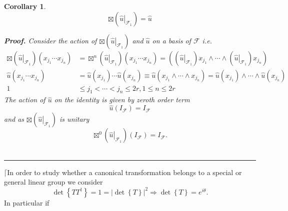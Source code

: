 \documentclass[aps, preprint]{revtex4}
\newtheorem{corollary}[theorem]{Corollary}
\newenvironment{proof}[1][Proof]{\noindent\textbf{#1.} }{\ \rule{0.5em}{0.5em}}
\begin{document}
\begin{corollary}
\begin{equation} \boxtimes \left (\left .\widehat{u}\right \vert _{\mathcal{F}_{1}}\right ) =\widehat{u}
\end{equation}


\begin{proof}
Consider the action of $ \boxtimes \left (\left .\widehat{u}\right \vert _{\mathcal{F}_{1}}\right )$ and $\widehat{u}$ on a basis of $\mathcal{F}$ i.e.
\begin{align} \boxtimes \left (\left .\widehat{u}\right \vert _{\mathcal{F}_{1}}\right ) \left (x_{j_{1}} \cdots  x_{j_{n}}\right ) &  = \boxtimes ^{n}\left (\left .\widehat{u}\right \vert _{\mathcal{F}_{1}}\right ) \left (x_{j_{1}} \cdots  x_{j_{n}}\right ) =\left (\left (\left .\widehat{u}\right \vert _{\mathcal{F}_{1}}\right ) x_{j_{1}} \wedge \cdots  \wedge \left (\left .\widehat{u}\right \vert _{\mathcal{F}_{1}}\right ) x_{j_{n}}\right ) \\
\widehat{u} \left (x_{j_{1}} \cdots  x_{j_{n}}\right ) &  =\widehat{u} \left (x_{j_{1}}\right ) \cdots  \widehat{u} \left (x_{j_{n}}\right ) \equiv \widehat{u} \left (x_{j_{1}} \wedge \cdots  \wedge x_{j_{n}}\right ) =\widehat{u} \left (x_{j_{1}}\right ) \wedge \cdots  \wedge \widehat{u} \left (x_{j_{n}}\right ) \\
1 &  \leq j_{1} <\cdots  <j_{n} \leq 2 r ,1 \leq n \leq 2 r\end{align}The action of $\widehat{u}$ on the identity is given by zeroth order term
\begin{equation}\widehat{u} \left (I_{\mathcal{F}}\right ) =I_{\mathcal{F}}
\end{equation}and as $ \boxtimes \left (\left .\widehat{u}\right \vert _{\mathcal{F}_{1}}\right )$ is unitary
\begin{equation} \boxtimes ^{0}\left (\left .\widehat{u}\right \vert _{\mathcal{F}_{1}}\right ) \left (I_{\mathcal{F}}\right ) =I_{\mathcal{F}}\text{.}
\end{equation}
\end{proof}


\end{corollary}

$\lceil $In order to study whether a canonical transformation belongs to a special or general linear group we consider
\begin{equation}\det \left \{T T^{ \dag }\right \} =1 =\left \vert \det \left \{T\right \}\right \vert ^{2} \Rightarrow \det \left \{T\right \} =e^{i \theta }\text{.}
\end{equation}In particular if 
\end{document}

